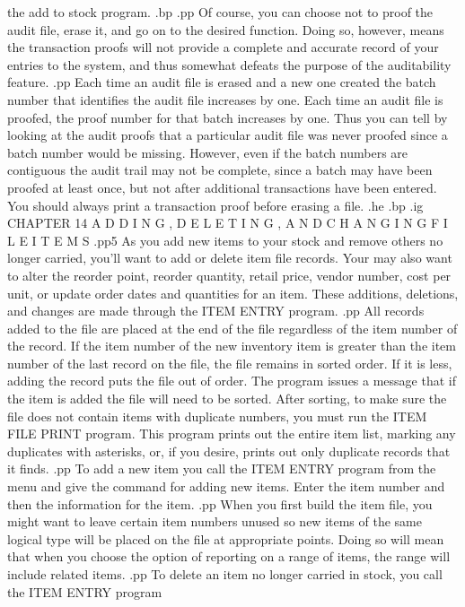 the add to stock program.
.bp
.pp
Of course, you can choose not to proof the audit file, erase it, and
go on to the desired function.	Doing so, however, means the transaction proofs
will not provide a complete and accurate record of your entries to the
system, and thus somewhat defeats the purpose of the auditability feature.
.pp
Each time an audit file is erased and a new one created the batch number
that identifies the audit file increases by one.  Each time an
audit file is proofed, the proof number for that batch increases by one.
Thus you can tell by looking at the audit proofs that a particular
audit file was never proofed since a batch number would be missing.
However, even if the batch numbers are contiguous the audit trail may not
be complete, since a batch may have been proofed at least once, but not
after additional transactions have been entered.  You should always
print a transaction proof before erasing a file.
.he
.bp
.ig
CHAPTER 14
A D D I N G ,  D E L E T I N G ,  A N D   C H A N G I N G
F I L E    I T E M S
.pp5
As you add new items to your stock and remove others no longer carried,
you'll want to add or delete item file records.  Your may also
want to alter the reorder point, reorder quantity, retail price, vendor
number, cost per unit, or update
order dates and quantities for an item.  These
additions, deletions, and changes are made through the ITEM ENTRY
program.
.pp
All records added to the file are placed at the end of the file regardless
of the item number of the record.  If the item number of the new inventory
item is greater than the item number of the last record on the file, the
file remains in sorted order.  If it is less, adding the record puts the file
out of order.
The program issues a message that if the item is
added the file will need to be sorted.	After sorting, to make sure
the file does not contain items with duplicate numbers, you must run
the ITEM FILE PRINT program.  This program prints out the entire item
list, marking any duplicates with asterisks, or, if you desire, prints
out only duplicate records that it finds.
.pp
To add a new item you call the ITEM ENTRY program from the menu and give
the command for adding new items.  Enter the item number and then
the information for the item.
.pp
When you first build the item file, you might want to leave certain
item numbers unused so new items of the same logical type will
be placed on the file at appropriate points.  Doing so will mean that
when you choose the option of reporting on a range of items, the range
will include related items.
.pp
To delete an item no longer carried in stock, you call the ITEM ENTRY program
